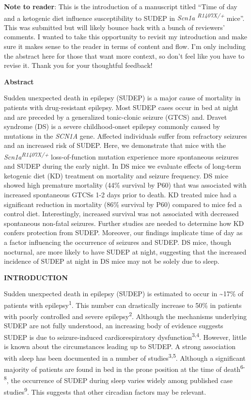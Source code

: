 \documentclass[]{article}
\date{}
\begin{document}
\textbf{Note to reader}: This is the introduction of a manuscript titled
``Time of day and a ketogenic diet influence susceptibility to SUDEP in
\emph{Scn1a \textsuperscript{R1407X/+}} mice''. This was submitted but
will likely bounce back with a bunch of reviewers' comments. I wanted to
take this opportunity to revisit my introduction and make sure it makes
sense to the reader in terms of content and flow. I'm only including the
abstract here for those that want more context, so don't feel like you
have to revise it. Thank you for your thoughtful feedback!

\textbf{Abstract}

Sudden unexpected death in epilepsy (SUDEP) is a major cause of
mortality in patients with drug-resistant epilepsy. Most SUDEP cases
occur in bed at night and are preceded by a generalized tonic-clonic
seizure (GTCS) and. Dravet syndrome (DS) is a severe childhood-onset
epilepsy commonly caused by mutations in the \emph{SCN1A} gene. Affected
individuals suffer from refractory seizures and an increased risk of
SUDEP. Here, we demonstrate that mice with the
\emph{Scn1a\textsuperscript{R1407X/+}} loss-of-function mutation
experience more spontaneous seizures and SUDEP during the early night.
In DS mice we evaluate effects of long-term ketogenic diet (KD)
treatment on mortality and seizure frequency. DS mice showed high
premature mortality (44\% survival by P60) that was associated with
increased spontaneous GTCSs 1-2 days prior to death. KD treated mice had
a significant reduction in mortality (86\% survival by P60) compared to
mice fed a control diet. Interestingly, increased survival was not
associated with decreased spontaneous non-fatal seizures. Further
studies are needed to determine how KD confers protection from SUDEP.
Moreover, our findings implicate time of day as a factor influencing the
occurrence of seizures and SUDEP. DS mice, though nocturnal, are more
likely to have SUDEP at night, suggesting that the increased incidence
of SUDEP at night in DS mice may not be solely due to sleep.

\textbf{INTRODUCTION}

Sudden unexpected death in epilepsy (SUDEP) is estimated to occur in
\textasciitilde{}17\% of patients with epilepsy\textsuperscript{1}. This
number can drastically increase to 50\% in patients with poorly
controlled and severe epilepsy\textsuperscript{2}. Although the
mechanisms underlying SUDEP are not fully understood, an increasing body
of evidence suggests SUDEP is due to seizure-induced cardiorespiratory
dysfunction\textsuperscript{3,4}. However, little is known about the
circumstances leading up to SUDEP. A strong association with sleep has
been documented in a number of studies\textsuperscript{3,5}. Although a
significant majority of patients are found in bed in the prone position
at the time of death\textsuperscript{6-8}, the occurrence of SUDEP
during sleep varies widely among published case
studies\textsuperscript{9}. This suggests that other circadian factors
may be relevant.
\end{document}
